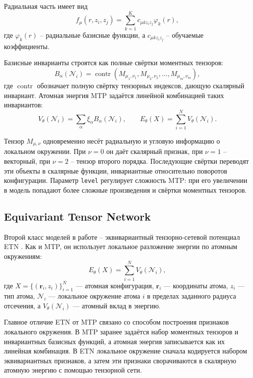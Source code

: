 Радиальная часть имеет вид
\[
f_\mu(r, z_i, z_j)
=
\sum_{k=1}^{K}
c_{\mu k z_i z_j}
\varphi_k(r),
\]
где \(\varphi_k(r)\) -- радиальные базисные функции, а \(c_{\mu k z_i z_j}\) -- обучаемые коэффициенты.

Базисные инварианты строятся как полные свёртки моментных тензоров:
\[
B_\alpha(\mathcal N_i)
=
\operatorname{contr}
\left(
M_{\mu_1,\nu_1},
M_{\mu_2,\nu_2},
\dots,
M_{\mu_m,\nu_m}
\right),
\]
где \(\operatorname{contr}\) обозначает полную свёртку тензорных индексов, дающую скалярный инвариант. Атомная энергия MTP задаётся линейной комбинацией таких инвариантов:
\[
V_\theta(\mathcal N_i)
=
\sum_{\alpha}
\xi_\alpha
B_\alpha(\mathcal N_i),
\qquad
E_\theta(X)
=
\sum_{i=1}^{N}
V_\theta(\mathcal N_i).
\]

Тензор \(M_{\mu,\nu}\) одновременно несёт радиальную и угловую информацию о локальном окружении. При \(\nu=0\) он даёт скалярный признак, при \(\nu=1\) -- векторный, при \(\nu=2\) -- тензор второго порядка. Последующие свёртки переводят эти объекты в скалярные функции, инвариантные относительно поворотов конфигурации. Параметр \texttt{level} регулирует сложность MTP: при его увеличении в модель попадают более сложные произведения и свёртки моментных тензоров.

\subsection{Equivariant Tensor Network}

Второй класс моделей в работе -- эквивариантный тензорно-сетевой потенциал ETN \cite{orus2014tnintro,stoudenmire2016tnml,hodapp2025etn}. Как и MTP, он использует локальное разложение энергии по атомным окружениям:
\begin{equation}
    E_\theta(X)
    =
    \sum_{i=1}^{N}
    V_\theta(\mathcal N_i),
\end{equation}
где \(X=\{(\mathbf r_i,z_i)\}_{i=1}^{N}\) --- атомная конфигурация, \(\mathbf r_i\) --- координаты атома, \(z_i\) --- тип атома, \(\mathcal N_i\) --- локальное окружение атома \(i\) в пределах заданного радиуса отсечения, а \(V_\theta(\mathcal N_i)\) --- атомный вклад в энергию.

Главное отличие ETN от MTP связано со способом построения признаков локального окружения. В MTP заранее задаётся набор моментных тензоров и инвариантных базисных функций, а атомная энергия записывается как их линейная комбинация. В ETN локальное окружение сначала кодируется набором эквивариантных признаков, а затем эти признаки сворачиваются в скалярную атомную энергию с помощью тензорной сети.

